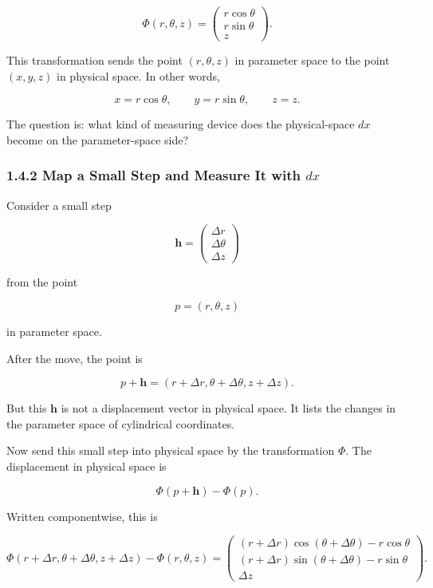 \[
\Phi(r,\theta,z)
=
\begin{pmatrix}
r\cos\theta\\
r\sin\theta\\
z
\end{pmatrix}.
\]

This transformation sends the point \((r,\theta,z)\) in parameter space
to the point \((x,y,z)\) in physical space. In other words,

\[
x=r\cos\theta,\qquad
y=r\sin\theta,\qquad
z=z.
\]

The question is: what kind of measuring device does the physical-space
\(dx\) become on the parameter-space side?

\hypertarget{map-a-small-step-and-measure-it-with-dx}{%
\subsubsection{\texorpdfstring{1.4.2 Map a Small Step and Measure It
with
\(dx\)}{1.4.2 Map a Small Step and Measure It with dx}}\label{map-a-small-step-and-measure-it-with-dx}}

Consider a small step

\[
\mathbf h
=
\begin{pmatrix}
\Delta r\\
\Delta\theta\\
\Delta z
\end{pmatrix}
\]

from the point

\[
p=(r,\theta,z)
\]

in parameter space.

After the move, the point is

\[
p+\mathbf h
=
(r+\Delta r,\theta+\Delta\theta,z+\Delta z).
\]

But this \(\mathbf h\) is not a displacement vector in physical space.
It lists the changes in the parameter space of cylindrical coordinates.

Now send this small step into physical space by the transformation
\(\Phi\). The displacement in physical space is

\[
\Phi(p+\mathbf h)-\Phi(p).
\]

Written componentwise, this is

\[
\Phi(r+\Delta r,\theta+\Delta\theta,z+\Delta z)
-
\Phi(r,\theta,z)
=
\begin{pmatrix}
(r+\Delta r)\cos(\theta+\Delta\theta)-r\cos\theta\\
(r+\Delta r)\sin(\theta+\Delta\theta)-r\sin\theta\\
\Delta z
\end{pmatrix}.
\]

